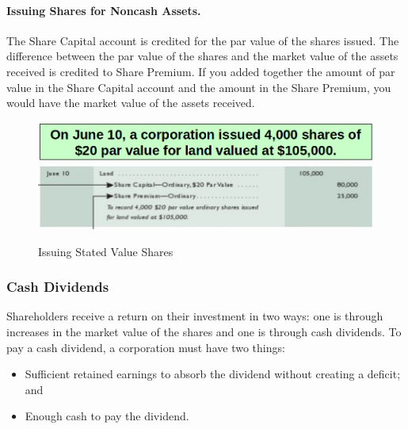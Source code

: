 \documentclass[../main.tex]{subfiles}
\begin{document}
	\paragraph{Issuing Shares for Noncash Assets.} The Share Capital account is 
	credited for the par value of the shares issued. The difference between the 
	par value of the shares and the market value of the assets received is 
	credited to Share Premium.  If you added together the amount of par value 
	in the Share Capital account and the amount in the Share Premium, you would 
	have the market value of the assets received.
	\begin{figure}[ht!]
		\centering
		\includegraphics[width=\columnwidth]{images/c9/noncash_eg1.png}
		\includegraphics[width=\columnwidth]{images/c9/noncash_eg2.png}
		\caption{Issuing Stated Value Shares}
	\end{figure}
	
	\subsubsection{Cash Dividends}
	
	Shareholders receive a return on their investment in two ways: one is 
	through increases in the market value of the shares and one is through cash 
	dividends. To pay a cash dividend, a corporation must have two things:
	\begin{itemize}[noitemsep]
		\item Sufficient retained earnings to absorb the dividend without 
		creating a deficit; and
		\item Enough cash to pay the dividend.
	\end{itemize}
	
\end{document}
